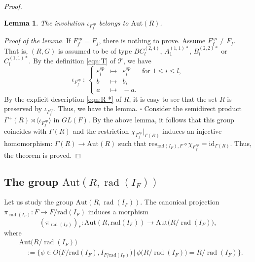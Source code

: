 \documentclass[11pt]{amsart}
\newtheorem{lemma}[thm]{Lemma}%
\newcommand{\rad}{\operatorname{rad}}
\begin{document}
{{\begin{proof}
\begin{lemma}
The involution $\iota_{F_f^{sp}}$ belongs to $\mathrm{Aut}(R)$. 
\end{lemma}
\vskip 1mm
\noindent
{\it Proof of the lemma}. 
If $F_f^{sp}=F_f$, there is nothing to prove. Assume $F_f^{sp}\ne F_f$. That is, 
$(R,G)$ is assumed to be of type $BC_l^{(2,4)}$, $A_1^{(1,1)\ast}$, $B_l^{(2,2)\ast}$ 
or $C_l^{(1,1)\ast}$. By the definition \eqref{eqn:T} of $\mathcal{T}$, we have
\[\iota_{F_f^{sp}}\ :\ \left\{
\begin{array}{lllllll}
\varepsilon_i^{sp} &\!\!\!\! \longmapsto &\!\!\! 
\varepsilon_i^{sp} & \mbox{for }1\leq i\leq l,\\
b &\!\!\!\! \longmapsto &\!\!\! b,\\
a &\!\!\!\! \longmapsto &\!\!\! -a.
\end{array}\right.\]
By the explicit description \eqref{eqn:R-*} of $R$, it is easy to see that 
the set $R$ is preserved by $\iota_{F_f^{sp}}$. Thus, we have the lemma. 
\hfill $\square$
\vskip 3mm
Consider the semidirect product $\Gamma^+(R)\rtimes \langle \iota_{F_f^{sp}}\rangle$
in $GL(F)$. By the above lemma, it follows that this group coincides with $\Gamma(R)$ 
and the restriction $\chi_{F_f^{sp}}|_{\Gamma(R)}$ induces an injective 
homomorphism{\rm :} $\Gamma(R)\to \mathrm{Aut}(R)$ such that 
$\mathrm{res}_{\mathrm{rad}(I_F),F}\circ\chi_{F_f^{sp}}=\mathrm{id}_{\Gamma(R)}$.
Thus, the theorem is proved.
\end{proof}
}
\subsection{The group $\mathrm{Aut}(R,\rad (I_F))$}

Let us study the group $\mathrm{Aut}(R,\rad (I_F))$. 
The canonical projection $\pi_{\rad(I_F)}:F\to F/\mathrm{rad}(I_F)$ 
induces a 
morphism
\[(\pi_{\rad(I_F)})_*:\mathrm{Aut}(R,\mathrm{rad}(I_F))\to 
\mathrm{Aut}\big(R/\rad (I_F)\big), \]
where
\begin{align*}
&\mbox{Aut}\big(R/\rad (I_F)\big)\\
&\quad :=\bigl\{\phi\in O\bigl(F/\mathrm{rad}(I_F),I_{F/\mathrm{rad}(I_F)}\bigr)\,
\bigl|\,\phi\big(R/\rad(I_F)\big)=R/\rad (I_F)\bigr\}.
\end{align*}

}
\end{document}
